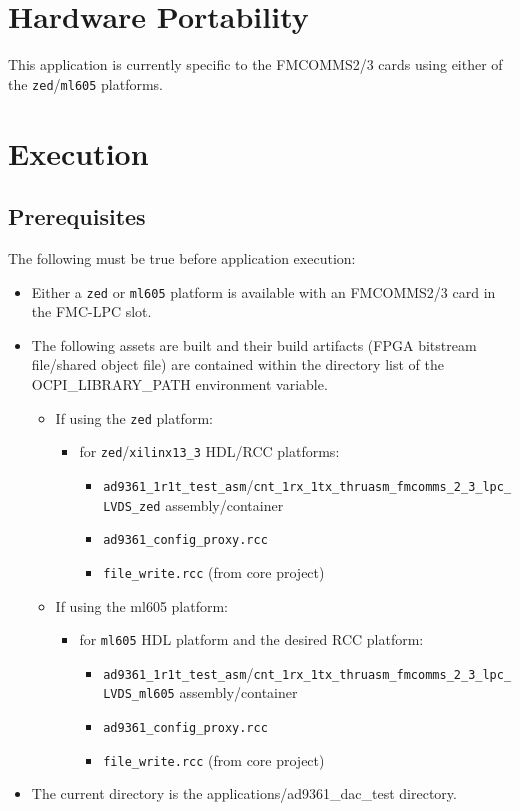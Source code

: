 \section{Hardware Portability}
This application is currently specific to the FMCOMMS2/3 cards using either of the \verb+zed+/\verb+ml605+ platforms.

\pagebreak
\section{Execution}
\subsection{Prerequisites}
The following must be true before application execution:
\begin{itemize}
  \item Either a \verb+zed+ or \verb+ml605+ platform is available with an FMCOMMS2/3 card in the FMC-LPC slot.
  \item The following assets are built and their build artifacts (FPGA bitstream file/shared object file) are contained within the directory list of the OCPI\_LIBRARY\_PATH environment variable.
  \begin{itemize}
    \item If using the \verb+zed+ platform:
    \begin{itemize}
      \item for \verb+zed+/\verb+xilinx13_3+ HDL/RCC platforms:
      \begin{itemize}
        \item \verb+ad9361_1r1t_test_asm+/\verb+cnt_1rx_1tx_thruasm_fmcomms_2_3_lpc_LVDS_zed+ assembly/container
        \item \verb+ad9361_config_proxy.rcc+
        \item \verb+file_write.rcc+ (from core project)
      \end{itemize}
    \end{itemize}
    \item If using the ml605 platform:
    \begin{itemize}
      \item for \verb+ml605+ HDL platform and the desired RCC platform:
      \begin{itemize}
        \item \verb+ad9361_1r1t_test_asm+/\verb+cnt_1rx_1tx_thruasm_fmcomms_2_3_lpc_LVDS_ml605+ assembly/container
        \item \verb+ad9361_config_proxy.rcc+
        \item \verb+file_write.rcc+ (from core project)
      \end{itemize}
    \end{itemize}
  \end{itemize}
\item The current directory is the applications/ad9361\_dac\_test directory.
\end{itemize}
